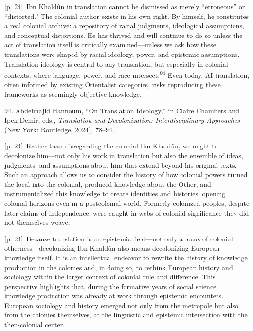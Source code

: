 \documentclass[10pt,a4paper]{article}
\begin{document}
{\scriptsize\color{gray} [p. 24]}\ Ibn Khaldûn in translation cannot be dismissed as merely “erroneous” or “distorted.” The colonial author exists in his own right. By himself, he constitutes a real colonial archive: a repository of racial judgments, ideological assumptions, and conceptual distortions. He has thrived and will continue to do so unless the act of translation itself is critically examined—unless we ask how these translations were shaped by racial ideology, power, and epistemic assumptions. Translation ideology is central to any translation, but especially in colonial contexts, where language, power, and race intersect.\nobreak\textsuperscript{94} Even today, AI translation, often informed by existing Orientalist categories, risks reproducing these frameworks as seemingly objective knowledge.\par{\small 94. Abdelmajid Hannoum, “On Translation Ideology,” in Claire Chambers and Ipek Demir, eds., \textit{Translation and Decolonization: Interdisciplinary Approaches} (New York: Routledge, 2024), 78–94.\par}
{\scriptsize\color{gray} [p. 24]}\ Rather than disregarding the colonial Ibn Khaldûn, we ought to decolonize him—not only his work in translation but also the ensemble of ideas, judgments, and assumptions about him that extend beyond his original texts. Such an approach allows us to consider the history of how colonial powers turned the local into the colonial, produced knowledge about the Other, and instrumentalized this knowledge to create identities and histories, opening colonial horizons even in a postcolonial world. Formerly colonized peoples, despite later claims of independence, were caught in webs of colonial significance they did not themselves weave.\par
{\scriptsize\color{gray} [p. 24]}\ Because translation is an epistemic field—not only a locus of colonial otherness—decolonizing Ibn Khaldûn also means decolonizing European knowledge itself. It is an intellectual endeavor to rewrite the history of knowledge production in the colonies and, in doing so, to rethink European history and sociology within the larger context of colonial rule and difference. This perspective highlights that, during the formative years of social science, knowledge production was already at work through epistemic encounters. European sociology and history emerged not only from the metropole but also from the colonies themselves, at the linguistic and epistemic intersection with the then-colonial center.\par
\end{document}
